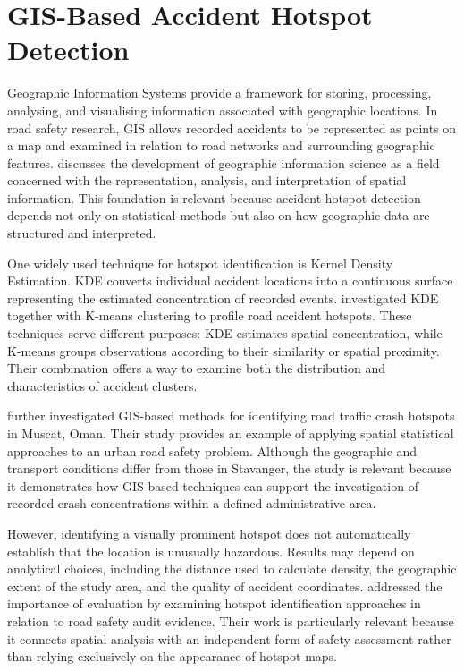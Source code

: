 \section{GIS-Based Accident Hotspot Detection}
\label{sec:lit-topic-1}
Geographic Information Systems provide a framework for storing, processing, analysing, and visualising information associated with geographic locations. In road safety research, GIS allows recorded accidents to be represented as points on a map and examined in relation to road networks and surrounding geographic features. \textcite{Goodchild2010} discusses the development of geographic information science as a field concerned with the representation, analysis, and interpretation of spatial information. This foundation is relevant because accident hotspot detection depends not only on statistical methods but also on how geographic data are structured and interpreted.

One widely used technique for hotspot identification is Kernel Density Estimation. KDE converts individual accident locations into a continuous surface representing the estimated concentration of recorded events. \textcite{Anderson2009} investigated KDE together with K-means clustering to profile road accident hotspots. These techniques serve different purposes: KDE estimates spatial concentration, while K-means groups observations according to their similarity or spatial proximity. Their combination offers a way to examine both the distribution and characteristics of accident clusters.

\textcite{AlAamri2021} further investigated GIS-based methods for identifying road traffic crash hotspots in Muscat, Oman. Their study provides an example of applying spatial statistical approaches to an urban road safety problem. Although the geographic and transport conditions differ from those in Stavanger, the study is relevant because it demonstrates how GIS-based techniques can support the investigation of recorded crash concentrations within a defined administrative area.

However, identifying a visually prominent hotspot does not automatically establish that the location is unusually hazardous. Results may depend on analytical choices, including the distance used to calculate density, the geographic extent of the study area, and the quality of accident coordinates. \textcite{Zahran2021} addressed the importance of evaluation by examining hotspot identification approaches in relation to road safety audit evidence. Their work is particularly relevant because it connects spatial analysis with an independent form of safety assessment rather than relying exclusively on the appearance of hotspot maps.

